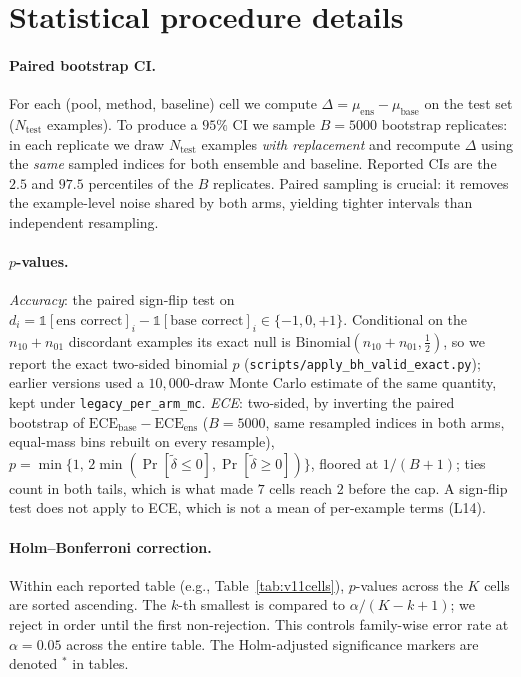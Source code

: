 \documentclass[11pt]{article}
\begin{document}
\section{Statistical procedure details}\label{app:stats}

\paragraph{Paired bootstrap CI.} For each (pool, method, baseline) cell we compute $\Delta=\mu_{\text{ens}}-\mu_{\text{base}}$ on the test set ($N_{\text{test}}$ examples). To produce a $95\%$ CI we sample $B{=}5000$ bootstrap replicates: in each replicate we draw $N_{\text{test}}$ examples \emph{with replacement} and recompute $\Delta$ using the \emph{same} sampled indices for both ensemble and baseline. Reported CIs are the $2.5$ and $97.5$ percentiles of the $B$ replicates. Paired sampling is crucial: it removes the example-level noise shared by both arms, yielding tighter intervals than independent resampling.

\paragraph{$p$-values.} \emph{Accuracy}: the paired sign-flip test on $d_i=\mathbb{1}[\text{ens correct}]_i - \mathbb{1}[\text{base correct}]_i \in\{-1,0,+1\}$. Conditional on the $n_{10}{+}n_{01}$ discordant examples its exact null is $\mathrm{Binomial}(n_{10}{+}n_{01},\tfrac12)$, so we report the exact two-sided binomial $p$ (\texttt{scripts/\allowbreak apply\_\allowbreak bh\_\allowbreak valid\_\allowbreak exact.\allowbreak py}); earlier versions used a $10{,}000$-draw Monte Carlo estimate of the same quantity, kept under \texttt{legacy\_\allowbreak per\_\allowbreak arm\_\allowbreak mc}. \emph{ECE}: two-sided, by inverting the paired bootstrap of $\mathrm{ECE}_{\text{base}}-\mathrm{ECE}_{\text{ens}}$ ($B{=}5000$, same resampled indices in both arms, equal-mass bins rebuilt on every resample), $p=\min\{1,\,2\min(\Pr[\tilde\delta\leq0],\Pr[\tilde\delta\geq0])\}$, floored at $1/(B+1)$; ties count in both tails, which is what made $7$ cells reach $2$ before the cap. A sign-flip test does not apply to ECE, which is not a mean of per-example terms (L14).

\paragraph{Holm--Bonferroni correction.} Within each reported table (e.g., Table~\ref{tab:v11cells}), $p$-values across the $K$ cells are sorted ascending. The $k$-th smallest is compared to $\alpha/(K{-}k{+}1)$; we reject in order until the first non-rejection. This controls family-wise error rate at $\alpha{=}0.05$ across the entire table. The Holm-adjusted significance markers are denoted $^{*}$ in tables.
\end{document}
